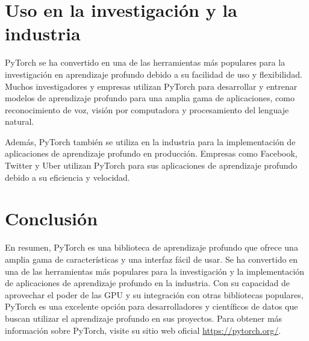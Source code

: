 \documentclass{article}
\begin{document}
\section{Uso en la investigación y la industria}
PyTorch se ha convertido en una de las herramientas más populares para la investigación en aprendizaje profundo debido a su facilidad de uso y flexibilidad. Muchos investigadores y empresas utilizan PyTorch para desarrollar y entrenar modelos de aprendizaje profundo para una amplia gama de aplicaciones, como reconocimiento de voz, visión por computadora y procesamiento del lenguaje natural.

Además, PyTorch también se utiliza en la industria para la implementación de aplicaciones de aprendizaje profundo en producción. Empresas como Facebook, Twitter y Uber utilizan PyTorch para sus aplicaciones de aprendizaje profundo debido a su eficiencia y velocidad.

\section{Conclusión}
En resumen, PyTorch es una biblioteca de aprendizaje profundo que ofrece una amplia gama de características y una interfaz fácil de usar. Se ha convertido en una de las herramientas más populares para la investigación y la implementación de aplicaciones de aprendizaje profundo en la industria. Con su capacidad de aprovechar el poder de las GPU y su integración con otras bibliotecas populares, PyTorch es una excelente opción para desarrolladores y científicos de datos que buscan utilizar el aprendizaje profundo en sus proyectos. Para obtener más información sobre PyTorch, visite su sitio web oficial \url{https://pytorch.org/}.
\end{document}
